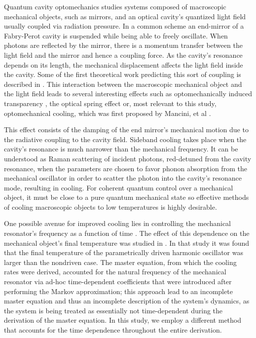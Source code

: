 \documentclass[reprint, amsmath,amssymb, aps,pra]{revtex4-1}
\begin{document}
Quantum cavity optomechanics studies systems composed of macroscopic
mechanical objects, such as mirrors, and an optical cavity's quantized
light field usually coupled via radiation pressure. In a common scheme
an end-mirror of a Fabry-Perot cavity is suspended while being able to
freely oscillate. When photons are reflected by the mirror, there is a
momentum transfer between the light field and the mirror and hence a
coupling force. As the cavity's resonance depends on its length, the
mechanical displacement affects the light field inside the cavity.
Some of the first theoretical work predicting this sort of coupling is
described in \cite{BraginskiiOG}. This interaction between the
macroscopic mechanical object and the light field leads to several
interesting effects such as optomechanically induced transparency
\cite{WeissOIT}, the optical spring effect \cite{VogelOT} or, most
relevant to this study, optomechanical cooling, which was first proposed by Mancini, et al \cite{CohadonCM,
  CorbittOC, SchliesserRPC, LCNooshi, ManciniOC}.
	
This effect consists of the damping of the end mirror's mechanical
motion due to the radiative coupling to the cavity field. Sideband
cooling takes place when the cavity's resonance is much narrower than
the mechanical frequency. It can be understood as Raman scattering
\cite{MarquardtQTOQ} of incident photons, red-detuned from the cavity
resonance, when the parameters are chosen to favor phonon absorption
from the mechanical oscillator in order to scatter the photon into the
cavity's resonance mode, resulting in cooling. For coherent quantum
control over a mechanical object, it must be close to a pure quantum
mechanical state \cite{KippenberCO} so effective methods of cooling
macroscopic objects to low temperatures is highly desirable.

One possible avenue for improved cooling lies in controlling the
mechanical resonator's frequency as a function of time
\cite{JockelMR}. The effect of this dependence on the mechanical
object's final temperature was studied in \cite{BarberisLC}. In that
study it was found that the final temperature of the parametrically
driven harmonic oscillator was larger than the nondriven case. The
master equation, from which the cooling rates were derived, accounted
for the natural frequency of the mechanical resonator via ad-hoc
time-dependent coefficients that were introduced after performing the
Markov approximation; this approach lead to an incomplete master
equation and thus an incomplete description of the system's dynamics,
as the system is being treated as essentially not time-dependent
during the derivation of the master equation. In this study, we employ
a different method that accounts for the time dependence throughout
the entire derivation.
\end{document}
